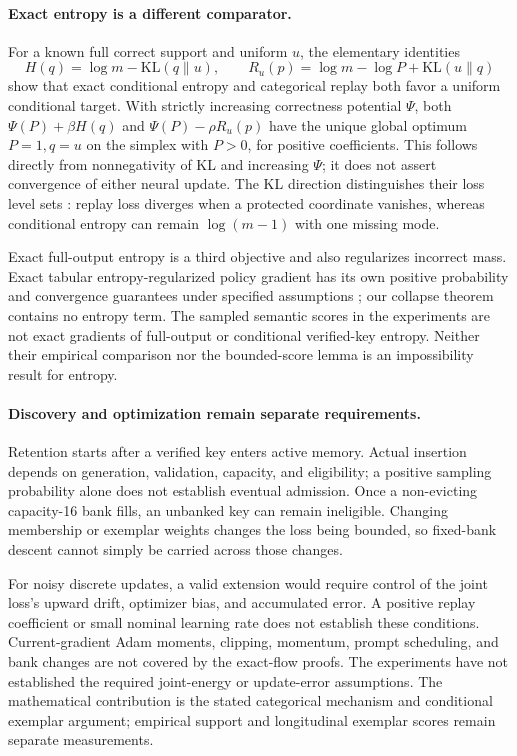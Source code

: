 \paragraph{Exact entropy is a different comparator.}
For a known full correct support and uniform $u$, the elementary identities
\[
 H(q)=\log m-\mathrm{KL}(q\|u),\qquad
 R_u(p)=\log m-\log P+\mathrm{KL}(u\|q)
\]
show that exact conditional entropy and categorical replay both favor a
uniform conditional target. With strictly increasing correctness potential
$\Psi$, both $\Psi(P)+\beta H(q)$ and $\Psi(P)-\rho R_u(p)$ have the unique
global optimum $P=1,q=u$ on the simplex with $P>0$, for positive coefficients. This follows directly
from nonnegativity of KL and increasing $\Psi$; it does not assert
convergence of either neural update. The KL direction distinguishes their
loss level sets \citep{pereyra2017confidencepenalty,agarwal2021policygradient}:
replay loss diverges when a protected coordinate vanishes, whereas
conditional entropy can remain $\log(m-1)$ with one missing mode.

Exact full-output entropy is a third objective and also regularizes incorrect
mass. Exact tabular entropy-regularized policy gradient has its own positive
probability and convergence guarantees under specified assumptions
\citep{mei2020softmaxpg}; our collapse theorem contains no entropy term.
The sampled semantic scores in the experiments are not exact gradients of
full-output or conditional verified-key entropy. Neither their empirical
comparison nor the bounded-score lemma is an impossibility result for entropy.

\paragraph{Discovery and optimization remain separate requirements.}
Retention starts after a verified key enters active memory. Actual insertion
depends on generation, validation, capacity, and eligibility; a positive
sampling probability alone does not establish eventual admission. Once a
non-evicting capacity-16 bank fills, an unbanked key can remain ineligible.
Changing membership or exemplar weights changes the loss being bounded, so
fixed-bank descent cannot simply be carried across those changes.

For noisy discrete updates, a valid extension would require control of the
joint loss's upward drift, optimizer bias, and accumulated error. A positive
replay coefficient or small nominal learning rate does not establish these
conditions. Current-gradient Adam moments, clipping, momentum, prompt
scheduling, and bank changes are not covered by the exact-flow proofs.
The experiments have not established the required joint-energy or
update-error assumptions. The mathematical contribution is the stated
categorical mechanism and conditional exemplar argument; empirical support
and longitudinal exemplar scores remain separate measurements.

